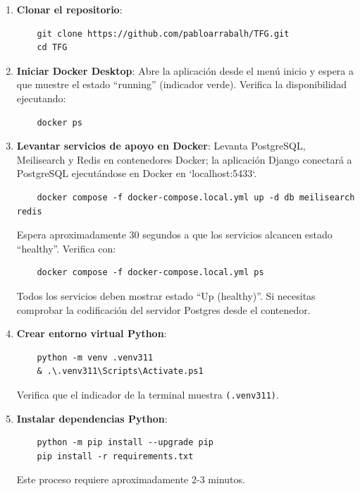 \begin{enumerate}
    \item \textbf{Clonar el repositorio}:
    \begin{verbatim}
    git clone https://github.com/pabloarrabalh/TFG.git
    cd TFG
    \end{verbatim}
    
    \item \textbf{Iniciar Docker Desktop}: Abre la aplicación desde el menú inicio y espera a que muestre el estado ``running'' (indicador verde). Verifica la disponibilidad ejecutando:
    \begin{verbatim}
    docker ps
    \end{verbatim}
    
    \item \textbf{Levantar servicios de apoyo en Docker}: Levanta PostgreSQL, Meilisearch y Redis en contenedores Docker; la aplicación Django conectará a PostgreSQL ejecutándose en Docker en `localhost:5433`.
    \begin{verbatim}
    docker compose -f docker-compose.local.yml up -d db meilisearch redis
    \end{verbatim}

    Espera aproximadamente 30 segundos a que los servicios alcancen estado ``healthy''. Verifica con:
    \begin{verbatim}
    docker compose -f docker-compose.local.yml ps
    \end{verbatim}

    Todos los servicios deben mostrar estado ``Up (healthy)''. Si necesitas comprobar la codificación del servidor Postgres desde el contenedor.
    
    \item \textbf{Crear entorno virtual Python}:
    \begin{verbatim}
    python -m venv .venv311
    & .\.venv311\Scripts\Activate.ps1
    \end{verbatim}
    
    Verifica que el indicador de la terminal muestra \texttt{(.venv311)}.
    
    \item \textbf{Instalar dependencias Python}: 
    \begin{verbatim}
    python -m pip install --upgrade pip
    pip install -r requirements.txt
    \end{verbatim}
    
    Este proceso requiere aproximadamente 2-3 minutos.
    

\end{enumerate}
